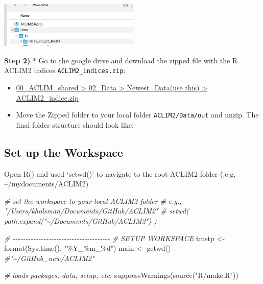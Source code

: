 \documentclass[
]{article}
\newenvironment{Shaded}{\begin{snugshade}}{\end{snugshade}}
\newcommand{\CommentTok}[1]{\textcolor[rgb]{0.56,0.35,0.01}{\textit{#1}}}
\newcommand{\FunctionTok}[1]{\textcolor[rgb]{0.00,0.00,0.00}{#1}}
\newcommand{\NormalTok}[1]{#1}
\newcommand{\OtherTok}[1]{\textcolor[rgb]{0.56,0.35,0.01}{#1}}
\newcommand{\StringTok}[1]{\textcolor[rgb]{0.31,0.60,0.02}{#1}}
\begin{document}
\includegraphics[width=0.5\textwidth,height=\textheight]{Figs/DATA_dir.png}

\textbf{Step 2)} * Go to the google drive and download the zipped file
with the R ACLIM2 indices \texttt{ACLIM2\_indices.zip}:

\begin{itemize}
\item
  \href{https://drive.google.com/drive/folders/11BQEfNEl9vvrN-V0LgS67XS4aLE9pNzz}{00\_ACLIM\_shared
  \textgreater{} 02\_Data \textgreater{} Newest\_Data(use this)
  \textgreater{} ACLIM2\_indice.zip}
\item
  Move the Zipped folder to your local folder \texttt{ACLIM2/Data/out}
  and unzip. The final folder structure should look like:
\end{itemize}

\hypertarget{set-up-the-workspace}{%
\subsection{Set up the Workspace}\label{set-up-the-workspace}}

Open R() and used `setwd()' to navigate to the root ACLIM2 folder (.e.g,
\textasciitilde/mydocuments/ACLIM2)

\begin{Shaded}
\begin{Highlighting}[]
    \CommentTok{\# set the workspace to your local ACLIM2 folder}
    \CommentTok{\# e.g., "/Users/kholsman/Documents/GitHub/ACLIM2"}
    \CommentTok{\# setwd( path.expand("\textasciitilde{}/Documents/GitHub/ACLIM2") )}
   
    \CommentTok{\# {-}{-}{-}{-}{-}{-}{-}{-}{-}{-}{-}{-}{-}{-}{-}{-}{-}{-}{-}{-}{-}{-}{-}{-}{-}{-}{-}{-}{-}{-}{-}{-}{-}{-}{-}{-}{-}{-}}
    \CommentTok{\# SETUP WORKSPACE}
\NormalTok{    tmstp  }\OtherTok{\textless{}{-}} \FunctionTok{format}\NormalTok{(}\FunctionTok{Sys.time}\NormalTok{(), }\StringTok{"\%Y\_\%m\_\%d"}\NormalTok{)}
\NormalTok{    main   }\OtherTok{\textless{}{-}} \FunctionTok{getwd}\NormalTok{()  }\CommentTok{\#"\textasciitilde{}/GitHub\_new/ACLIM2"}
    
    \CommentTok{\# loads packages, data, setup, etc.}
    \FunctionTok{suppressWarnings}\NormalTok{(}\FunctionTok{source}\NormalTok{(}\StringTok{"R/make.R"}\NormalTok{))}
\end{Highlighting}
\end{Shaded}
\end{document}
